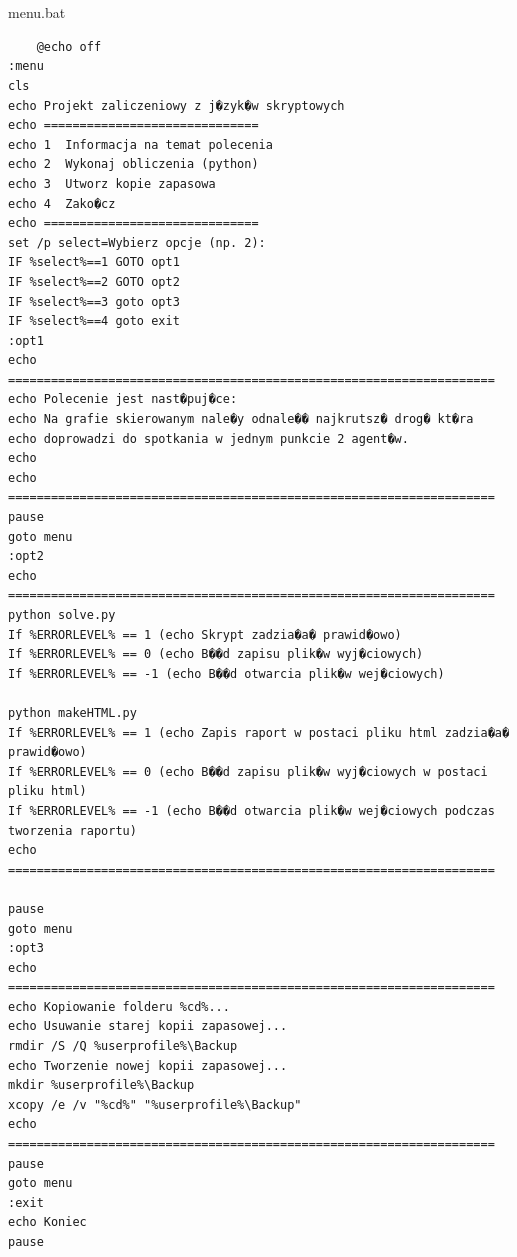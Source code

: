 \documentclass[12pt,a4paper]{article}
\begin{document}
    
    \\\\menu.bat
    \begin{lstlisting}
    @echo off
:menu
cls
echo Projekt zaliczeniowy z j�zyk�w skryptowych
echo ==============================
echo 1	Informacja na temat polecenia
echo 2	Wykonaj obliczenia (python)
echo 3	Utworz kopie zapasowa
echo 4	Zako�cz
echo ==============================
set /p select=Wybierz opcje (np. 2):
IF %select%==1 GOTO opt1
IF %select%==2 GOTO opt2
IF %select%==3 goto opt3
IF %select%==4 goto exit
:opt1
echo ====================================================================
echo Polecenie jest nast�puj�ce:
echo Na grafie skierowanym nale�y odnale�� najkrutsz� drog� kt�ra 
echo doprowadzi do spotkania w jednym punkcie 2 agent�w. 
echo 
echo ====================================================================
pause
goto menu
:opt2
echo ====================================================================
python solve.py
If %ERRORLEVEL% == 1 (echo Skrypt zadzia�a� prawid�owo)
If %ERRORLEVEL% == 0 (echo B��d zapisu plik�w wyj�ciowych)
If %ERRORLEVEL% == -1 (echo B��d otwarcia plik�w wej�ciowych)

python makeHTML.py
If %ERRORLEVEL% == 1 (echo Zapis raport w postaci pliku html zadzia�a� prawid�owo)
If %ERRORLEVEL% == 0 (echo B��d zapisu plik�w wyj�ciowych w postaci pliku html)
If %ERRORLEVEL% == -1 (echo B��d otwarcia plik�w wej�ciowych podczas tworzenia raportu)
echo ====================================================================

pause
goto menu
:opt3
echo ====================================================================
echo Kopiowanie folderu %cd%...
echo Usuwanie starej kopii zapasowej...
rmdir /S /Q %userprofile%\Backup
echo Tworzenie nowej kopii zapasowej...
mkdir %userprofile%\Backup
xcopy /e /v "%cd%" "%userprofile%\Backup"
echo ====================================================================
pause
goto menu
:exit
echo Koniec
pause
    \end{lstlisting}
    
    
    
\end{document}
